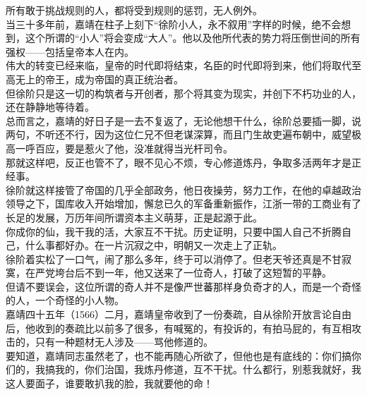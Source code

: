 \begin{multicols}{\theparacolNo}
所有敢于挑战规则的人，都将受到规则的惩罚，无人例外。\\

当三十多年前，嘉靖在柱子上刻下“徐阶小人，永不叙用”字样的时候，绝不会想到，这个所谓的“小人”将会变成“大人”。他以及他所代表的势力将压倒世间的所有强权——包括皇帝本人在内。\\

伟大的转变已经来临，皇帝的时代即将结束，名臣的时代即将到来，他们将取代至高无上的帝王，成为帝国的真正统治者。\\

但徐阶只是这一切的构筑者与开创者，那个将其变为现实，并创下不朽功业的人，还在静静地等待着。\\

总而言之，嘉靖的好日子是一去不复返了，无论他想干什么，徐阶总要插一脚，说两句，不听还不行，因为这位仁兄不但老谋深算，而且门生故吏遍布朝中，威望极高一呼百应，要是惹火了他，没准就得当光杆司令。\\

那就这样吧，反正也管不了，眼不见心不烦，专心修道炼丹，争取多活两年才是正经事。\\

徐阶就这样接管了帝国的几乎全部政务，他日夜操劳，努力工作，在他的卓越政治领导之下，国库收入开始增加，懈怠已久的军备重新振作，江浙一带的工商业有了长足的发展，万历年间所谓资本主义萌芽，正是起源于此。\\

你成你的仙，我干我的活，大家互不干扰。历史证明，只要中国人自己不折腾自己，什么事都好办。在一片沉寂之中，明朝又一次走上了正轨。\\

徐阶着实松了一口气，闹了那么多年，终于可以消停了。但老天爷还真是不甘寂寞，在严党垮台后不到一年，他又送来了一位奇人，打破了这短暂的平静。\\

但请不要误会，这位所谓的奇人并不是像严世蕃那样身负奇才的人，而是一个奇怪的人，一个奇怪的小人物。\\

嘉靖四十五年（1566）二月，嘉靖皇帝收到了一份奏疏，自从徐阶开放言论自由后，他收到的奏疏比以前多了很多，有喊冤的，有投诉的，有拍马屁的，有互相攻击的，只有一种题材无人涉及——骂他修道的。\\

要知道，嘉靖同志虽然老了，也不能再随心所欲了，但他也是有底线的：你们搞你们的，我搞我的，你们治国，我炼丹修道，互不干扰。什么都行，别惹我就好，我这人要面子，谁要敢扒我的脸，我就要他的命！\\


\end{multicols}
